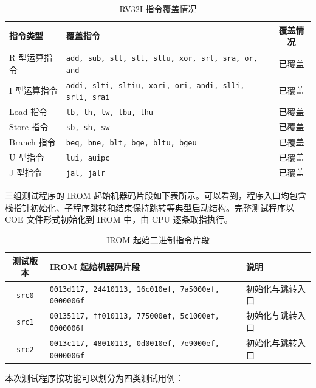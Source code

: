\documentclass[12pt,a4paper]{ctexart}
\newcommand{\code}[1]{\texttt{#1}}
\begin{document}
\begin{table}[H]
	\centering
	\caption{RV32I 指令覆盖情况}
	\small
	\begin{tabular}{p{3cm}|p{9.5cm}|c}
		\hline
		指令类型 & 覆盖指令 & 覆盖情况 \\
		\hline
		R 型运算指令 & \code{add, sub, sll, slt, sltu, xor, srl, sra, or, and} & 已覆盖 \\
		I 型运算指令 & \code{addi, slti, sltiu, xori, ori, andi, slli, srli, srai} & 已覆盖 \\
		Load 指令 & \code{lb, lh, lw, lbu, lhu} & 已覆盖 \\
		Store 指令 & \code{sb, sh, sw} & 已覆盖 \\
		Branch 指令 & \code{beq, bne, blt, bge, bltu, bgeu} & 已覆盖 \\
		U 型指令 & \code{lui, auipc} & 已覆盖 \\
		J 型指令 & \code{jal, jalr} & 已覆盖 \\
		\hline
	\end{tabular}
\end{table}

三组测试程序的 IROM 起始机器码片段如下表所示。可以看到，程序入口均包含栈指针初始化、子程序跳转和结束保持跳转等典型启动结构。完整测试程序以 COE 文件形式初始化到 IROM 中，由 CPU 逐条取指执行。

\begin{table}[H]
	\centering
	\caption{IROM 起始二进制指令片段}
	\small
	\begin{tabular}{c|p{9.5cm}|p{3cm}}
		\hline
		测试版本 & IROM 起始机器码片段 & 说明 \\
		\hline
		\code{src0} & \code{0013d117, 24410113, 16c010ef, 7a5000ef, 0000006f} & 初始化与跳转入口 \\
		\code{src1} & \code{00135117, ff010113, 775000ef, 5c1000ef, 0000006f} & 初始化与跳转入口 \\
		\code{src2} & \code{0013c117, 48010113, 0d0010ef, 7e9000ef, 0000006f} & 初始化与跳转入口 \\
		\hline
	\end{tabular}
\end{table}

本次测试程序按功能可以划分为四类测试用例：
\end{document}
